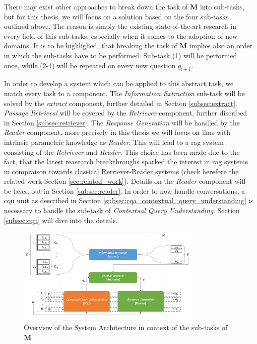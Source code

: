 There may exist other approaches to break down the task of $\mathbf{M}$ into sub-tasks, but for this thesis, we will focus on a solution based on the four sub-tasks outlined above. The reason is simply the existing state-of-the-art research in every field of this sub-tasks, especially when it comes to the adoption of new domains. It is to be highlighed, that breaking the task of $\mathbf{M}$ implies also an order in which the sub-tasks have to be performed. Sub-task (1) will be performed once, while (2-4) will be repeated on every new question $q_{i+1}$.

In order to develop a system which can be applied to this abstract task, we match every task to a component. The \textit{Information Extraction} sub-task will be solved by the \textit{extract} component, further detailed in Section \ref{subsec:extract}. \textit{Passage Retrieval} will be covered by the \textit{Retriever} component, further discribed in Section \ref{subsec:retriever}. The \textit{Response Generation} will be handled by the \textit{Reader} component, more precisely in this thesis we will focus on \gls{llm}s with intrinsic parametric knowledge as \textit{Reader}. This will lead to a \gls{rag} system consisting of the \textit{Retriever} and \textit{Reader}. This choice has been made due to the fact, that the latest reasearch breakthroughs sparked the interest in \gls{rag} systems in compraison towards classical Retriever-Reader systems (check herefore the related work Section \ref{sec:related_work}). Details on the \textit{Reader} component will be layed out in Section \ref{subsec:reader}. In order to now handle conversations, a \gls{cqu} unit as described in Section \ref{subsec:cqa_contextual_query_understanding} is necessary to handle the sub-task of \textit{Contextual Query Understanding}. Section \ref{subsec:cqu} will dive into the details.

\begin{figure}
    \centering
    \includegraphics[width=0.8\textwidth]{Grafiken/conrag_konzeptionell.png}
    \caption{Overview of the System Architecture in context of the sub-tasks of $\mathbf{M}$}
    \label{fig:conrag_concept_system_architecture}
\end{figure}

